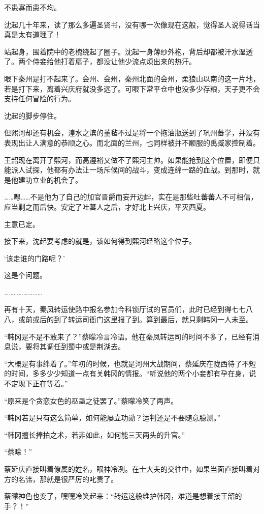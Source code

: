 不患寡而患不均。

沈起几十年来，读了那么多遍圣贤书，没有哪一次像现在这般，觉得圣人说得话当真是太有道理了！

站起身，围着院中的老槐绕起了圈子。沈起一身薄纱外袍，背后却都被汗水湿透了。两个侍妾给他打着扇子，都没让他少流点烦出来的热汗。

眼下秦州是打不起来了。会州、会州，秦州北面的会州，柔狼山以南的这一片地，若是打下来，离着兴庆府就没多远了。可眼下常平仓中也没多少存粮，天子更不会支持任何冒险的行为。

沈起的脚步停住。

但熙河却还有机会，湟水之滨的董毡不过是将一个拖油瓶送到了巩州蕃学，并没有表现出让人满意的恭顺之心。而北面的兰州，也同样被并不顺服的禹臧家控制着。

王韶现在离开了熙河，而高遵裕又做不了熙河主帅。如果能抢到这个位置，即便只能派人试探，他都有办法让一场斥候间的战斗，变成连绵一路的血战。到那时，就是他建功立业的机会了。

……嗯……不是他为了自己的加官晋爵而妄开边衅，实在是那些吐蕃蕃人不可相信，应当剿之而后快。安定了吐蕃人之后，才好北上兴庆，平灭西夏。

主意已定。

接下来，沈起要考虑的就是，该如何得到熙河经略这个位子。

‘该走谁的门路呢？’

这是个问题。

……………………

再有十天，秦凤转运使路中报名参加今科锁厅试的官员们，此时已经到得七七八八，或前或后的到了转运司衙门这里报了到。算到最后，就只剩韩冈一人未至。

“韩冈是不是不敢来了？”蔡曚冷言冷语。他在秦凤转运司的时间不多了，已经有消息说，要将其调任到蜀中或是荆湖去。

“大概是有事绊着了。”年初的时候，也就是河州大战期间，蔡延庆在陇西待了不短的时间，多多少少知道一点有关韩冈的情报。“听说他的两个小妾都有孕在身，说不定现下正在等着。”

“原来是个贪恋女色的巫蛊之徒罢了。”蔡曚冷笑了两声。

“韩冈若是只有这么简单，如何能屡立功勋？运判还是不要随意臆测。”

“韩冈擅长捧拍之术，若非如此，如何能三天两头的升官。”

“蔡曚！”

蔡延庆直接叫着僚属的姓名，眼神冷冽。在士大夫的交往中，如果当面直接叫着对方的名讳，那就是很严厉的叱责了。

蔡曚神色也变了，嘿嘿冷笑起来：“转运这般维护韩冈，难道是想着接王韶的手？！”


